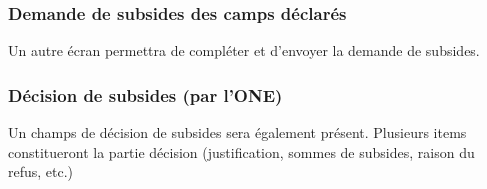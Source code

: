 \subsubsection{Demande de subsides des camps déclarés}
Un autre écran permettra de compléter et d'envoyer la demande de subsides.


\subsubsection{Décision de subsides (par l'ONE)}
Un champs de décision de subsides sera également présent. Plusieurs items constitueront la partie décision (justification, sommes de subsides, raison du refus, etc.)







